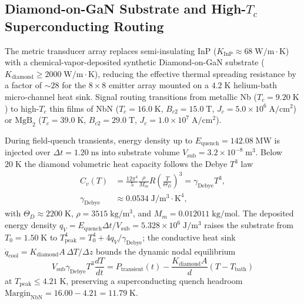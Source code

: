 \documentclass[10pt,twocolumn]{IEEEtran}
\begin{document}
\subsection{Diamond-on-GaN Substrate and High-$T_c$ Superconducting Routing}
\label{sec:diamond_transducer}

The metric transducer array replaces semi-insulating InP
($K_{\mathrm{InP}}\approx68\;\mathrm{W/m\cdot K}$) with a
chemical-vapor-deposited synthetic Diamond-on-GaN substrate
($K_{\mathrm{diamond}}\geq2000\;\mathrm{W/m\cdot K}$), reducing the
effective thermal spreading resistance by a factor of $\sim28$ for the
$8\times8$ emitter array mounted on a $4.2\;\mathrm{K}$ helium-bath
micro-channel heat sink.  Signal routing transitions from metallic Nb
($T_c=9.20\;\mathrm{K}$) to high-$T_c$ thin films of NbN
($T_c=16.0\;\mathrm{K}$, $B_{c2}=15.0\;\mathrm{T}$,
$J_c=5.0\times10^{6}\;\mathrm{A/cm^{2}}$) or $\mathrm{MgB}_2$
($T_c=39.0\;\mathrm{K}$, $B_{c2}=29.0\;\mathrm{T}$,
$J_c=1.0\times10^{7}\;\mathrm{A/cm^{2}}$).

During field-quench transients, energy density up to
$E_{\mathrm{quench}}=142.08\;\mathrm{MW}$ is injected over
$\Delta t=1.20\;\mathrm{ns}$ into substrate volume
$V_{\mathrm{sub}}=3.2\times10^{-8}\;\mathrm{m^{3}}$.  Below $20\;\mathrm{K}$
the diamond volumetric heat capacity follows the Debye $T^{3}$ law
\begin{equation}
\begin{aligned}
C_v(T)&=\frac{12\pi^{4}}{5}\frac{\rho}{M_m}R
\left(\frac{T}{\Theta_D}\right)^{3}=\gamma_{\mathrm{Debye}}T^{3},\\
\gamma_{\mathrm{Debye}}&\approx0.0534\;\mathrm{J/m^{3}\cdot K^{4}},
\end{aligned}
\label{eq:debye_t3}
\end{equation}
with $\Theta_D\approx2200\;\mathrm{K}$, $\rho=3515\;\mathrm{kg/m^{3}}$,
and $M_m=0.012011\;\mathrm{kg/mol}$.  The deposited energy density
$q_V=E_{\mathrm{quench}}\Delta t/V_{\mathrm{sub}}=5.328\times10^{6}\;\mathrm{J/m^{3}}$
raises the substrate from $T_0=1.50\;\mathrm{K}$ to
$T_{\mathrm{peak}}^{4}=T_0^{4}+4q_V/\gamma_{\mathrm{Debye}}$; the
conductive heat sink $\dot{q}_{\mathrm{cool}}=K_{\mathrm{diamond}}
A\,\Delta T/\Delta z$ bounds the dynamic nodal equilibrium
\begin{equation}
V_{\mathrm{sub}}\gamma_{\mathrm{Debye}}T^{3}\frac{dT}{dt}
=P_{\mathrm{transient}}(t)
-\frac{K_{\mathrm{diamond}}A}{d}(T-T_{\mathrm{bath}})
\label{eq:nodal_quench}
\end{equation}
at $T_{\mathrm{peak}}\leq4.21\;\mathrm{K}$, preserving a superconducting
quench headroom
$\mathrm{Margin}_{\mathrm{NbN}}=16.00-4.21=11.79\;\mathrm{K}$.
\end{document}
